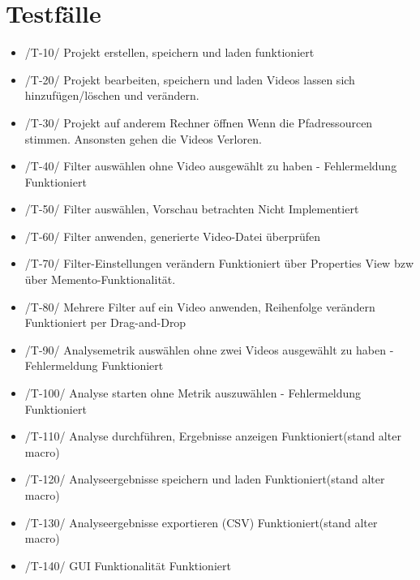 \section{Testfälle}
\begin{itemize}
\item /T-10/ Projekt erstellen, speichern und laden
funktioniert
\item /T-20/ Projekt bearbeiten, speichern und laden
Videos lassen sich hinzufügen/löschen und verändern.
\item /T-30/ Projekt auf anderem Rechner öffnen
Wenn die Pfadressourcen stimmen. Ansonsten gehen die Videos Verloren.
\item /T-40/ Filter auswählen ohne Video ausgewählt zu haben - Fehlermeldung
Funktioniert
\item /T-50/ Filter auswählen, Vorschau betrachten
Nicht Implementiert
\item /T-60/ Filter anwenden, generierte Video-Datei überprüfen

\item /T-70/ Filter-Einstellungen verändern
Funktioniert über Properties View bzw über Memento-Funktionalität.
\item /T-80/ Mehrere Filter auf ein Video anwenden, Reihenfolge verändern
Funktioniert per Drag-and-Drop
\item /T-90/ Analysemetrik auswählen ohne zwei Videos ausgewählt zu haben - Fehlermeldung
Funktioniert
\item /T-100/ Analyse starten ohne Metrik auszuwählen - Fehlermeldung
Funktioniert
\item /T-110/ Analyse durchführen, Ergebnisse anzeigen
Funktioniert(stand alter macro)
\item /T-120/ Analyseergebnisse speichern und laden
Funktioniert(stand alter macro)
\item /T-130/ Analyseergebnisse exportieren (CSV)
Funktioniert(stand alter macro)
\item /T-140/ GUI Funktionalität
Funktioniert
\end{itemize}